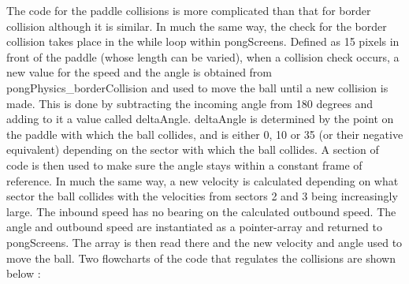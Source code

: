 \documentclass[a4paper,12pt]{article}
\begin{document}
\begin{flushleft}
The code for the paddle collisions is more complicated than that for border collision although it is similar. In much the same way, the check for the border collision takes place in the while loop within pongScreens. Defined as 15 pixels in front of the paddle (whose length can be varied), when a collision check occurs, a new value for the speed and the angle is obtained from pongPhysics\_borderCollision and used to move the ball until a new collision is made. This is done by subtracting the incoming angle from 180 degrees and adding to it a value called deltaAngle. deltaAngle is determined by the point on the paddle with which the ball collides, and is either 0, 10 or 35 (or their negative equivalent) depending on the sector with which the ball collides. A section of code is then used to make sure the angle stays within a constant frame of reference. In much the same way, a new velocity is calculated depending on what sector the ball collides with the velocities from sectors 2 and 3 being increasingly large. The inbound speed has no bearing on the calculated outbound speed. The angle and outbound speed are instantiated as a pointer-array and returned to pongScreens. The array is then read there and the new velocity and angle used to move the ball.
\newpage
Two flowcharts of the code that regulates the collisions are shown below :
\begin{figure}[H]
    \centering

\end{figure}
\end{flushleft}
\end{document}

